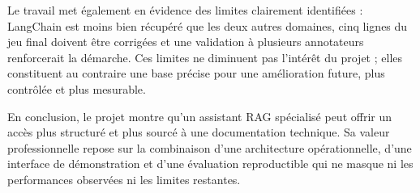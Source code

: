 \documentclass[12pt,a4paper,oneside]{report}
\begin{document}
Le travail met également en évidence des limites clairement identifiées :
LangChain est moins bien récupéré que les deux autres domaines, cinq lignes du
jeu final doivent être corrigées et une validation à plusieurs annotateurs
renforcerait la démarche. Ces limites ne diminuent pas l'intérêt du projet ;
elles constituent au contraire une base précise pour une amélioration future,
plus contrôlée et plus mesurable.

En conclusion, le projet montre qu'un assistant RAG spécialisé peut offrir un
accès plus structuré et plus sourcé à une documentation technique. Sa valeur
professionnelle repose sur la combinaison d'une architecture opérationnelle,
d'une interface de démonstration et d'une évaluation reproductible qui ne
masque ni les performances observées ni les limites restantes.
\end{document}
